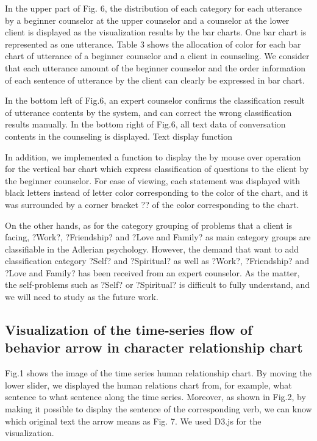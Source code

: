 \documentclass[review]{elsarticle}
\begin{document}

In the upper part of Fig. 6, the distribution of each category for each utterance by a beginner counselor at the upper counselor and a counselor at the lower client is displayed as the visualization results by the bar charts. One bar chart is represented as one utterance. Table 3 shows the allocation of color for each bar chart of utterance of a beginner counselor and a client in counseling. We consider that each utterance amount of the beginner counselor and the order information of each sentence of utterance by the client can clearly be expressed in bar chart.


  In the bottom left of Fig.6, an expert counselor confirms the classification result of utterance contents by the system, and can correct the wrong classification results manually. In the bottom right of Fig.6, all text data of conversation contents in the counseling is displayed. 
Text display function

In addition, we implemented a function to display the by mouse over operation for the vertical bar chart which express classification of questions to the client by the beginner counselor. For ease of viewing, each statement was displayed with black letters instead of letter color corresponding to the color of the chart, and it was surrounded by a corner bracket ?? of the color corresponding to the chart.

On the other hands, as for the category grouping of problems that a client is facing, ?Work?, ?Friendship? and ?Love and Family? as main category groups are classifiable in the Adlerian psychology. However, the demand that want to add classification category ?Self? and ?Spiritual? as well as ?Work?, ?Friendship? and ?Love and Family? has been received from an expert counselor. As the matter, the self-problems such as ?Self? or ?Spiritual? is difficult to fully understand, and we will need to study as the future work.

\subsection{Visualization of the time-series flow of behavior arrow in character relationship chart}

  Fig.1 shows the image of the time series human relationship chart. By moving the lower slider, we displayed the human relations chart from, for example, what sentence to what sentence along the time series. Moreover, as shown in Fig.2, by making it possible to display the sentence of the corresponding verb, we can know which original text the arrow means as Fig. 7. We used D3.js\cite{vand3} for the visualization.
\end{document}
